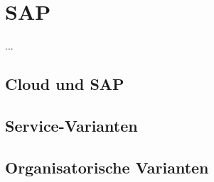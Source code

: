 \section{SAP}
\label{sec_sap}

...

\subsection{Cloud und SAP}
\label{sec_sap_general}



\subsection{Service-Varianten}
\label{sec_sap_delivery}



\subsection{Organisatorische Varianten}
\label{sec_sap_deployment}

